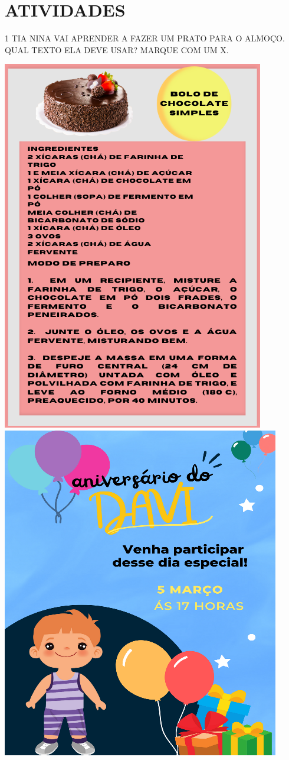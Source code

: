 \pagebreak
\section{ATIVIDADES}

\num{1} TIA NINA VAI APRENDER A FAZER UM PRATO PARA O ALMOÇO. QUAL TEXTO ELA DEVE USAR? MARQUE COM UM X.

\includegraphics[width=.5\textwidth]{media/image137.png}
\includegraphics[width=.5\textwidth]{media/image138.png}


